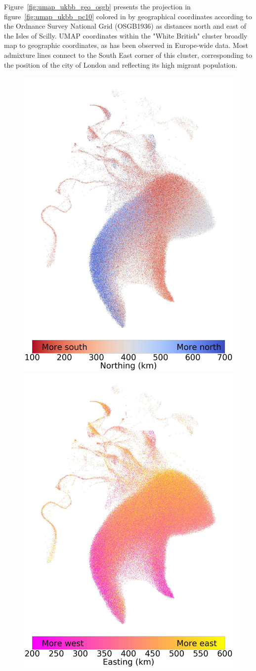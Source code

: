 \documentclass[12pt]{pnas-new}
\begin{document}
Figure~\ref{fig:umap_ukbb_geo_osgb} presents the projection in figure~\ref{fig:umap_ukbb_pc10} colored in by  geographical coordinates according to the Ordnance Survey National Grid (OSGB1936) as distances north and east of the Isles of Scilly. UMAP coordinates within the "White British" cluster broadly map to geographic coordinates, as has been observed in Europe-wide data\cite{novembre2008europe}. Most admixture lines connect to the South East corner of this cluster, corresponding to the position of the city of London and reflecting its high migrant population.  

\begin{figure}
    \centering
    \includegraphics[width=0.49\columnwidth]{images/UKBB_UMAP_PC10_NN15_MD05_2018328174511_ns_permuted_10nn_sd50000_base50000_201883118582.pdf}
    \includegraphics[width=.49\columnwidth]{images/UKBB_UMAP_PC10_NN15_MD05_2018328174511_ew_permuted_10nn_sd50000_base50000_201883118582.pdf}

\end{figure}
\end{document}
